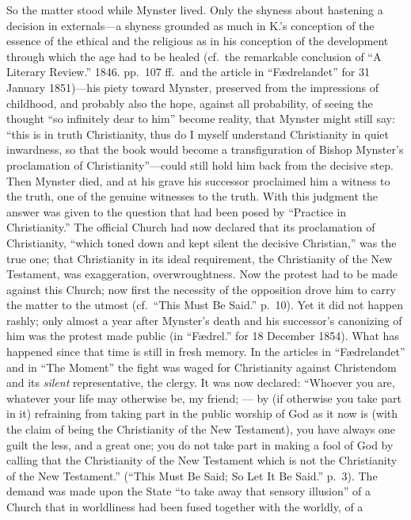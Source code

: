 \documentclass[12pt,a4paper]{article}
\begin{document}
So the matter stood while Mynster lived. Only the shyness about hastening a
decision in externals---a shyness grounded as much in K.'s conception of the
essence of the ethical and the religious as in his conception of the development
through which the age had to be healed (cf.\ the remarkable conclusion of ``A
Literary Review.'' 1846. pp.\ 107 ff.\ and the article in ``Fædrelandet'' for
31 January 1851)---his piety toward Mynster, preserved from
the impressions of childhood, and probably also the hope, against all probability,
of seeing the thought ``so infinitely dear to him'' become reality, that Mynster
might still say: ``this is in truth Christianity, thus do I myself understand
Christianity in quiet inwardness, so that the book would become a transfiguration
of Bishop Mynster's proclamation of Christianity''---could still hold him back from
the decisive step. Then Mynster died, and at his grave his successor proclaimed him
a witness to the truth, one of the genuine witnesses to the truth. With this
judgment the answer was given to the question that had been posed by ``Practice in
Christianity.'' The official Church had now declared that its proclamation of
Christianity, ``which toned down and kept silent the decisive Christian,'' was the
true one; that Christianity in its ideal requirement, the Christianity of the New
Testament, was exaggeration, overwroughtness. Now the protest had to be made
against this Church; now first the necessity of the opposition drove him to carry
the matter to the utmost (cf.\ ``This Must Be Said.'' p.\ 10). Yet it did not
happen rashly; only almost a year after Mynster's death and his successor's
canonizing of him was the protest made public (in ``Fædrel.'' for 18 December
1854). What has happened since that time is still in fresh memory. In the articles
in ``Fædrelandet'' and in ``The Moment'' the fight was waged for Christianity
against Christendom and its \emph{silent} representative, the clergy. It was now declared:
``Whoever you are, whatever your life may otherwise be, my friend; --- by (if
otherwise you take part in it) refraining from taking part in the public worship of
God as it now is (with the claim of being the Christianity of the New Testament),
you have always one guilt the less, and a great one; you do not take part in making
a fool of God by calling that the Christianity of the New Testament which is not
the Christianity of the New Testament.'' (``This Must Be Said; So Let It Be Said.''
p.\ 3). The demand was made upon the State ``to take away that sensory illusion''
of a Church that in worldliness had been fused together with the worldly, of a
\end{document}
